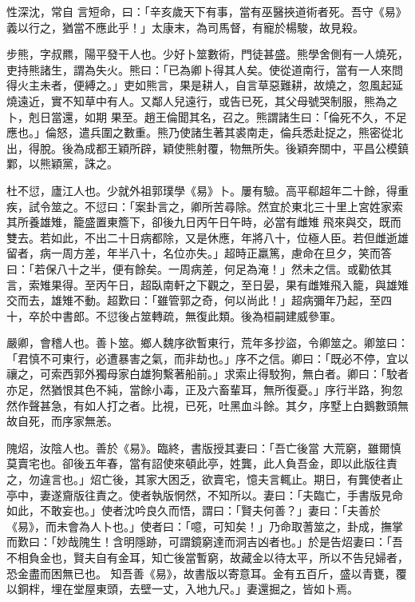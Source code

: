 \begin{pinyinscope}
 性深沈，常自
 言短命，曰：「辛亥歲天下有事，當有巫醫挾道術者死。吾守《易》義以行之，猶當不應此乎！」太康末，為司馬督，有寵於楊駿，故見殺。



 步熊，字叔羆，陽平發干人也。少好卜筮數術，門徒甚盛。熊學舍側有一人燒死，吏持熊諸生，謂為失火。熊曰：「已為卿卜得其人矣。使從道南行，當有一人來問得火主未者，便縛之。」吏如熊言，果是耕人，自言草惡難耕，故燒之，忽風起延燒遠近，實不知草中有人。又鄰人兒遠行，或告已死，其父母號哭制服，熊為之卜，剋日當還，如期
 果至。趙王倫聞其名，召之。熊謂諸生曰：「倫死不久，不足應也。」倫怒，遣兵圍之數重。熊乃使諸生著其裘南走，倫兵悉赴捉之，熊密從北出，得脫。後為成都王穎所辟，穎使熊射覆，物無所失。後穎奔關中，平昌公模鎮鄴，以熊穎黨，誅之。



 杜不愆，廬江人也。少就外祖郭璞學《易》卜。屢有驗。高平郗超年二十餘，得重疾，試令筮之。不愆曰：「案卦言之，卿所苦尋除。然宜於東北三十里上宮姓家索其所養雄雉，籠盛置東簷下，卻後九日丙午日午時，必當有雌雉
 飛來與交，既而雙去。若如此，不出二十日病都除，又是休應，年將八十，位極人臣。若但雌逝雄留者，病一周方差，年半八十，名位亦失。」超時正羸篤，慮命在旦夕，笑而答曰：「若保八十之半，便有餘矣。一周病差，何足為淹！」然未之信。或勸依其言，索雉果得。至丙午日，超臥南軒之下觀之，至日晏，果有雌雉飛入籠，與雄雉交而去，雄雉不動。超歎曰：「雖管郭之奇，何以尚此！」超病彌年乃起，至四十，卒於中書郎。不愆後占筮轉疏，無復此類。後為桓嗣建威參軍。



 嚴卿，會稽人也。善卜筮。鄉人魏序欲暫東行，荒年多抄盜，令卿筮之。卿筮曰：「君慎不可東行，必遭暴害之氣，而非劫也。」序不之信。卿曰：「既必不停，宜以禳之，可索西郭外獨母家白雄狗繫著船前。」求索止得駮狗，無白者。卿曰：「駮者亦足，然猶恨其色不純，當餘小毒，正及六畜輩耳，無所復憂。」序行半路，狗忽然作聲甚急，有如人打之者。比視，已死，吐黑血斗餘。其夕，序墅上白鵝數頭無故自死，而序家無恙。



 隗炤，汝陰人也。善於《易》。臨終，書版授其妻曰：「吾亡後當
 大荒窮，雖爾慎莫賣宅也。卻後五年春，當有詔使來頓此亭，姓龔，此人負吾金，即以此版往責之，勿違言也。」炤亡後，其家大困乏，欲賣宅，憶夫言輒止。期日，有龔使者止亭中，妻遂齎版往責之。使者執版惘然，不知所以。妻曰：「夫臨亡，手書版見命如此，不敢妄也。」使者沈吟良久而悟，謂曰：「賢夫何善？」妻曰：「夫善於《易》，而未會為人卜也。」使者曰：「噫，可知矣！」乃命取蓍筮之，卦成，撫掌而歎曰：「妙哉隗生！含明隱跡，可謂鏡窮達而洞吉凶者也。」於是告炤妻曰：「吾不相負金也，賢夫自有金耳，知亡後當暫窮，故藏金以待太平，所以不告兒婦者，恐金盡而困無已也。
 知吾善《易》，故書版以寄意耳。金有五百斤，盛以青甕，覆以銅柈，埋在堂屋東頭，去壁一丈，入地九尺。」妻還掘之，皆如卜焉。




\end{pinyinscope}
